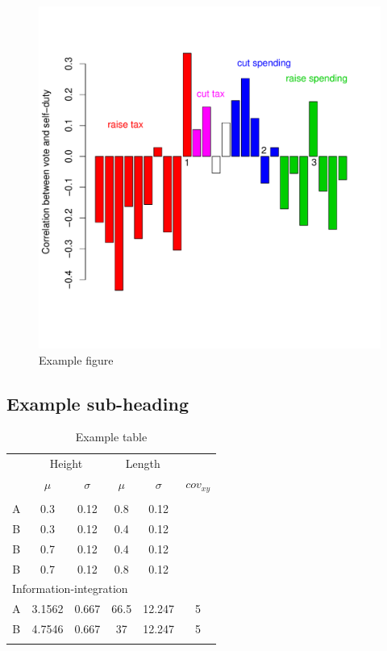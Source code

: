 \documentclass[twocolumn]{article}
\begin{document}
\begin{figure}[t!]
\includegraphics[width=\columnwidth]{dut11.pdf}
\caption{Example figure}
\end{figure}

\subsection{Example sub-heading}

\begin{table}[b!]
	\begin{center}
	\caption{Example table}
	\label{table:ply043CategoryParameters}
		\begin{tabular}[b]{c c c c c c}
			\hline\noalign{\smallskip}
			& \multicolumn{2}{c}{Height} & \multicolumn{2}{c}{Length} &\\
			& $\mu$ & $\sigma$ & $\mu$ & $\sigma$ & $cov_{xy}$ \\
			\noalign{\smallskip}\hline\noalign{\smallskip}
						\multicolumn{5}{l}{Conjunction} \\
			\noalign{\smallskip}
			A & 0.3 & 0.12 & 0.8 & 0.12 \\
			B & 0.3 & 0.12 & 0.4 & 0.12 \\ 
			B & 0.7 & 0.12 & 0.4 & 0.12 \\
			B & 0.7 & 0.12 & 0.8 & 0.12 \\
			\multicolumn{5}{l}{Information-integration} \\
			A & 3.1562 & 0.667 & 66.5 & 12.247 & 5\\
			B & 4.7546 & 0.667 & 37 & 12.247 & 5\\
			\noalign{\smallskip}\hline
		\end{tabular}
	\end{center}
\end{table}
\end{document}
